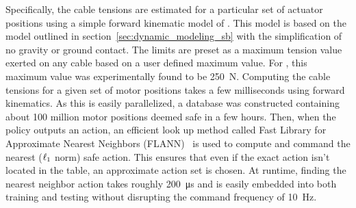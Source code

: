 
Specifically, the cable tensions are estimated for a particular set of actuator positions using a simple forward kinematic model of \SB{}.
This model is based on the model outlined in section~\ref{sec:dynamic_modeling_sb} with the simplification of no gravity or ground contact.
The limits are preset as a maximum tension value exerted on any cable based on a user defined maximum value.
For \SB{}, this maximum value was experimentally found to be \SI{250}{\newton}.
Computing the cable tensions for a given set of motor positions takes a few milliseconds using forward
kinematics. As this is easily parallelized, a database was constructed containing
about 100 million motor positions deemed safe in a few hours.
Then, when the policy outputs an action, an efficient look up method called Fast
Library for Approximate Nearest Neighbors (FLANN)~\cite{flannsoftware} is used to compute
and command the nearest ($\ell_1$ norm) safe action.
This ensures that even if the exact action isn't located in the table, an approximate action set is chosen.
At runtime, finding the nearest neighbor action takes roughly \SI{200}{\micro\second} and is
easily embedded into both training and testing without disrupting the command
frequency of \SI{10}{\hertz}.


